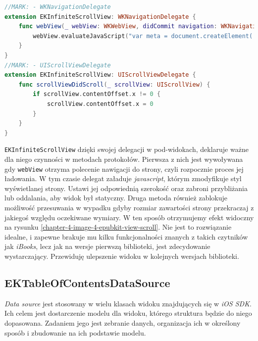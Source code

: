\begin{lstlisting}[language=swift,caption={Rozszerzenie klasy \texttt{EKInfiniteScrollView} o protokoły \texttt{WKNavigationDelegate} oraz \texttt{UIScrollViewDelegate}}, label=EKInfiniteScrollView-extension-2]
//MARK: - WKNavigationDelegate
extension EKInfiniteScrollView: WKNavigationDelegate {
    func webView(_ webView: WKWebView, didCommit navigation: WKNavigation!) {
        webView.evaluateJavaScript("var meta = document.createElement('meta');meta.setAttribute('name', 'viewport');meta.setAttribute('content', 'width=device-width, initial-scale=1.0, minimum-scale=1.0, maximum-scale=1.0, user-scalable=no');document.getElementsByTagName('head')[0].appendChild(meta);")
    }
}
//MARK: - UIScrollViewDelegate
extension EKInfiniteScrollView: UIScrollViewDelegate {
    func scrollViewDidScroll(_ scrollView: UIScrollView) {
        if scrollView.contentOffset.x != 0 {
            scrollView.contentOffset.x = 0
        }
    }
}
\end{lstlisting}

\texttt{EKInfiniteScrollView} dzięki swojej delegacji w pod-widokach, deklaruje ważne dla niego czynności w metodach protokołów. Pierwsza z nich jest wywoływana gdy \texttt{webView} otrzyma polecenie nawigacji do strony, czyli rozpocznie proces jej ładowania. W tym czasie delegat załaduje \textit{javascript}, którym zmodyfikuje styl wyświetlanej strony. Ustawi jej odpowiednią szerokość oraz zabroni przybliżania lub oddalania, aby widok był statyczny. Druga metoda również zablokuje możliwość przesuwania w wypadku gdyby rozmiar zawartości strony przekraczaj z jakiegoś względu oczekiwane wymiary. W ten sposób otrzymujemy efekt widoczny na rysunku \ref{chapter-4-image-4-epubkit-view-scroll}. Nie jest to rozwiązanie idealne, i zapewne brakuje mu kilku funkcjonalności znanych z takich czytników jak \textit{iBooks}, lecz jak na wersje pierwszą biblioteki, jest zdecydowanie wystarczający. Przewiduję ulepszenie widoku w kolejnych wersjach biblioteki.

\subsection{EKTableOfContentsDataSource}

\textit{Data source} jest stosowany w wielu klasach widoku znajdujących się w \textit{iOS SDK}. Ich celem jest dostarczenie modelu dla widoku, którego struktura będzie do niego dopasowana. Zadaniem jego jest zebranie danych, organizacja ich w określony sposób i zbudowanie na ich podstawie modelu.

